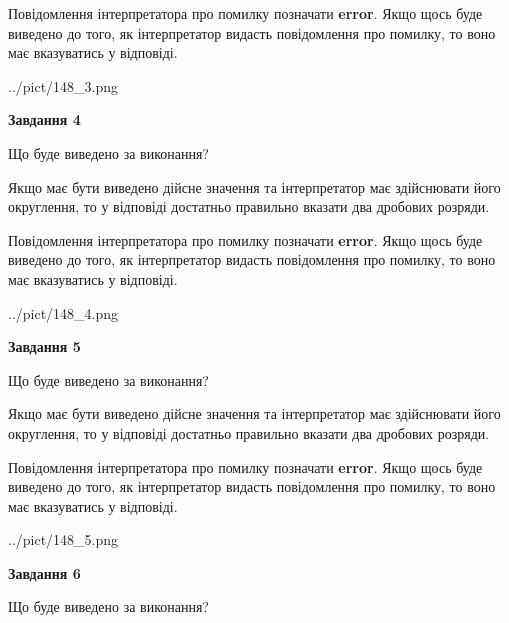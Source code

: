 \documentclass[12pt, ukrainian]{article}
\begin{document}
{\begin {Large}
Повідомлення інтерпретатора про помилку позначати \textbf{error}.
Якщо щось буде виведено до того, як інтерпретатор видасть повідомлення про помилку, 
то воно має вказуватись у відповіді. \par

\begin{center}
	{../pict/148_3.png}
\end{center}
\newpage

{\begin {center}\textbf{Завдання 4}\end {center}}\par
Що буде виведено за виконання? \par

Якщо має бути виведено дійсне значення та інтерпретатор має здійснювати його округлення, 
то у відповіді достатньо правильно вказати два дробових розряди.

Повідомлення інтерпретатора про помилку позначати \textbf{error}.
Якщо щось буде виведено до того, як інтерпретатор видасть повідомлення про помилку, 
то воно має вказуватись у відповіді. \par

\begin{center}
	{../pict/148_4.png}
\end{center}
\newpage

{\begin {center}\textbf{Завдання 5}\end {center}}\par
Що буде виведено за виконання? \par

Якщо має бути виведено дійсне значення та інтерпретатор має здійснювати його округлення, 
то у відповіді достатньо правильно вказати два дробових розряди.

Повідомлення інтерпретатора про помилку позначати \textbf{error}.
Якщо щось буде виведено до того, як інтерпретатор видасть повідомлення про помилку, 
то воно має вказуватись у відповіді. \par

\begin{center}
	{../pict/148_5.png}
\end{center}
\newpage

{\begin {center}\textbf{Завдання 6}\end {center}}\par
Що буде виведено за виконання? \par


\end{Large}}
\end{document}
